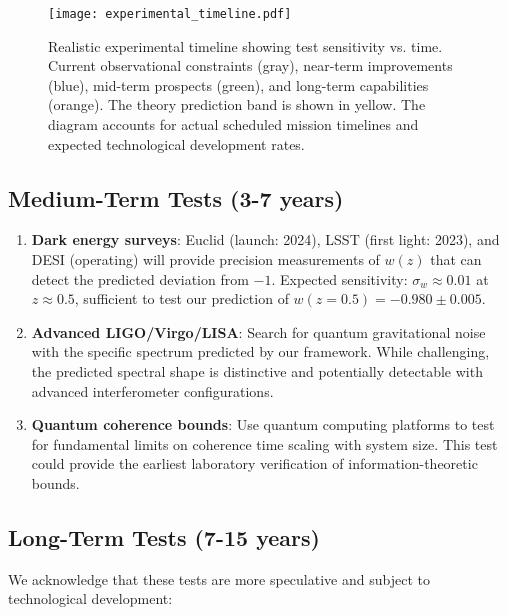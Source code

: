 \documentclass[12pt]{article}
\theoremstyle{plain}
\theoremstyle{definition}
\theoremstyle{remark}
\begin{document}
\begin{figure}
\centering
\texttt{[image: experimental\_timeline.pdf]}
\caption{Realistic experimental timeline showing test sensitivity vs. time. Current observational constraints (gray), near-term improvements (blue), mid-term prospects (green), and long-term capabilities (orange). The theory prediction band is shown in yellow. The diagram accounts for actual scheduled mission timelines and expected technological development rates.}
\end{figure}

\subsection{Medium-Term Tests (3-7 years)}

\begin{enumerate}
\item \textbf{Dark energy surveys}: Euclid (launch: 2024), LSST (first light: 2023), and DESI (operating) will provide precision measurements of $w(z)$ that can detect the predicted deviation from $-1$. Expected sensitivity: $\sigma_w \approx 0.01$ at $z \approx 0.5$, sufficient to test our prediction of $w(z=0.5) = -0.980 \pm 0.005$.

\item \textbf{Advanced LIGO/Virgo/LISA}: Search for quantum gravitational noise with the specific spectrum predicted by our framework. While challenging, the predicted spectral shape is distinctive and potentially detectable with advanced interferometer configurations.

\item \textbf{Quantum coherence bounds}: Use quantum computing platforms to test for fundamental limits on coherence time scaling with system size. This test could provide the earliest laboratory verification of information-theoretic bounds.
\end{enumerate}

\subsection{Long-Term Tests (7-15 years)}

We acknowledge that these tests are more speculative and subject to technological development:
\end{document}
